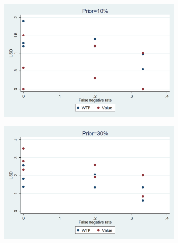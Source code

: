 \documentclass[11pt,a4paper]{article}
\begin{document}
\begin{figure}[!h]
\centering
\caption{Base rate fallacy for WTP: FN rate sensitivity by prior} \label{WTP_FN_coll}
\begin{subfigure}[t]{0.5\textwidth}
  \centering
  \includegraphics[width=.95\linewidth]{Graphs/hist_WTP_FN_coll1.png}
\end{subfigure}%
\begin{subfigure}[t]{0.5\textwidth}
  \centering
  \includegraphics[width=.95\linewidth]{Graphs/hist_WTP_FN_coll3.png}
\end{subfigure}



\end{figure}
\end{document}
